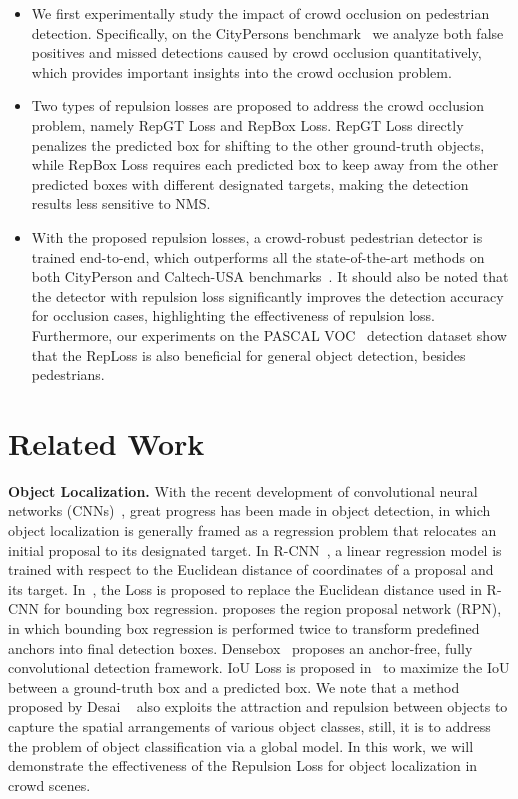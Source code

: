 \documentclass[10pt,twocolumn,letterpaper]{article}
\newcommand{\myparagraph}[1]{{\vspace{0.5em} \noindent \bf #1}}
\begin{document}
\begin{itemize}
\setlength{\itemsep}{0pt}
\setlength{\parskip}{0pt}
\setlength{\parsep}{0pt}
  \item We first experimentally study the impact of crowd occlusion on pedestrian detection. Specifically, on the CityPersons benchmark~\cite{zhang2017citypersons} we analyze both false positives and missed detections caused by crowd occlusion quantitatively, which provides important insights into the crowd occlusion problem.
  \item Two types of repulsion losses are proposed to address the crowd occlusion problem, namely RepGT Loss and RepBox Loss. RepGT Loss directly penalizes the predicted box for shifting to the other ground-truth objects, while RepBox Loss requires each predicted box to keep away from the other predicted boxes with different designated targets, making the detection results less sensitive to NMS.
  \item With the proposed repulsion losses, a crowd-robust pedestrian detector is trained end-to-end, which outperforms all the state-of-the-art methods on both CityPerson and Caltech-USA benchmarks~\cite{dollar2009pedestrian}. It should also be noted that the detector with repulsion loss significantly improves the detection accuracy for occlusion cases, highlighting the effectiveness of repulsion loss. Furthermore, our experiments on the PASCAL VOC~\cite{everingham2010pascal} detection dataset show that the RepLoss is also beneficial for general object detection, besides pedestrians. 
\end{itemize}

\section{Related Work}


\myparagraph{Object Localization.} With the recent development of convolutional neural networks (CNNs)~\cite{krizhevsky2012imagenet,simonyan2014very,he2016deep}, great progress has been made in object detection, in which object localization is generally framed as a regression problem that relocates an initial proposal to its designated target. In R-CNN~\cite{Girshick_2014_CVPR}, a linear regression model is trained with respect to the Euclidean distance of coordinates of a proposal and its target. In~\cite{Girshick_2015_ICCV}, the  Loss is proposed to replace the Euclidean distance used in R-CNN for bounding box regression. \cite{NIPS2015_5638} proposes the region proposal network (RPN), in which bounding box regression is performed twice to transform predefined anchors into final detection boxes. Densebox~\cite{huang2015densebox} proposes an anchor-free, fully convolutional detection framework. IoU Loss is proposed in~\cite{yu2016unitbox} to maximize the IoU between a ground-truth box and a predicted box.  We note that a method proposed by Desai \etal~\cite{desai2011discriminative} also exploits  the attraction and repulsion between objects to capture the spatial arrangements of various object classes, still, it is to address the problem of object classification via a global model. In this work, we will demonstrate the effectiveness of the Repulsion Loss for object localization in crowd scenes.
\end{document}
